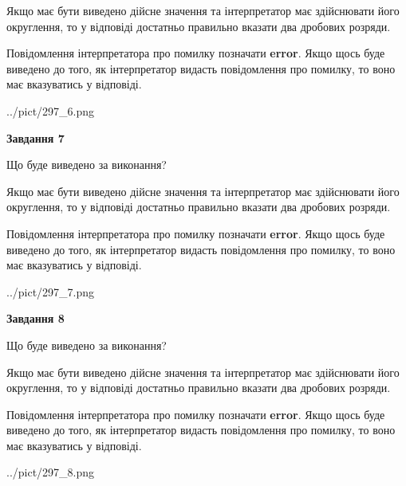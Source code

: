 \documentclass[12pt, ukrainian]{article}
\begin{document}
{\begin {Large}
Якщо має бути виведено дійсне значення та інтерпретатор має здійснювати його округлення, 
то у відповіді достатньо правильно вказати два дробових розряди.

Повідомлення інтерпретатора про помилку позначати \textbf{error}.
Якщо щось буде виведено до того, як інтерпретатор видасть повідомлення про помилку, 
то воно має вказуватись у відповіді. \par

\begin{center}
	{../pict/297_6.png}
\end{center}
\newpage

{\begin {center}\textbf{Завдання 7}\end {center}}\par
Що буде виведено за виконання? \par

Якщо має бути виведено дійсне значення та інтерпретатор має здійснювати його округлення, 
то у відповіді достатньо правильно вказати два дробових розряди.

Повідомлення інтерпретатора про помилку позначати \textbf{error}.
Якщо щось буде виведено до того, як інтерпретатор видасть повідомлення про помилку, 
то воно має вказуватись у відповіді. \par

\begin{center}
	{../pict/297_7.png}
\end{center}
\newpage

{\begin {center}\textbf{Завдання 8}\end {center}}\par
Що буде виведено за виконання? \par

Якщо має бути виведено дійсне значення та інтерпретатор має здійснювати його округлення, 
то у відповіді достатньо правильно вказати два дробових розряди.

Повідомлення інтерпретатора про помилку позначати \textbf{error}.
Якщо щось буде виведено до того, як інтерпретатор видасть повідомлення про помилку, 
то воно має вказуватись у відповіді. \par

\begin{center}
	{../pict/297_8.png}
\end{center}
\newpage


\end{Large}}
\end{document}

